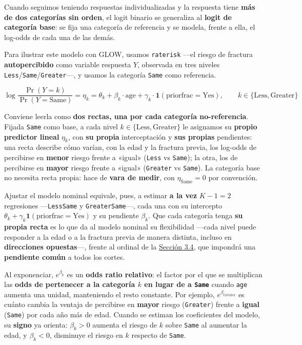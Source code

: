\documentclass[
  letterpaper,
  DIV=11,
  numbers=noendperiod]{scrartcl}
\begin{document}
Cuando seguimos teniendo respuestas individualizadas y la respuesta
tiene \textbf{más de dos categorías sin orden}, el logit binario se
generaliza al \textbf{logit de categoría base}: se fija una categoría de
referencia y se modela, frente a ella, el log-odds de cada una de las
demás.

Para ilustrar este modelo con GLOW, usamos \texttt{raterisk} ---el
riesgo de fractura \textbf{autopercibido} como variable respuesta \(Y\),
observada en tres niveles
\texttt{Less}/\texttt{Same}/\texttt{Greater}---, y usamos la categoría
\texttt{Same} como referencia.

\[
 \log\frac{\Pr(Y=k)}{\Pr(Y=\text{Same})}=\eta_{k}= \theta_{k} + \beta_{k} \cdot \text{age} + \gamma_{k} \cdot \mathbf{1}(\text{priorfrac}=\text{Yes}), \qquad k\in\{\text{Less},\text{Greater}\}
 \]

Conviene leerla como \textbf{dos rectas, una por cada categoría
no-referencia}. Fijada \texttt{Same} como base, a cada nivel
\(k\in\{\text{Less},\text{Greater}\}\) le asignamos su \textbf{propio
predictor lineal} \(\eta_{k}\), con \textbf{su propia} interceptación y
\textbf{sus propias} pendientes: una recta describe cómo varían, con la
edad y la fractura previa, los log-odds de percibirse en \textbf{menor}
riesgo frente a «igual» (\texttt{Less} vs \texttt{Same}); la otra, los
de percibirse en \textbf{mayor} riesgo frente a «igual»
(\texttt{Greater} vs \texttt{Same}). La categoría base no necesita recta
propia: hace de \textbf{vara de medir}, con \(\eta_{\text{Same}}=0\) por
convención.

Ajustar el modelo nominal equivale, pues, a estimar \textbf{a la vez}
\(K−1=2\) regresiones ---\texttt{Less\textbar{}Same} y
\texttt{Greater\textbar{}Same}---, cada una con su intercepto
\(\theta_k+\gamma_k\mathbf{1}(\text{priorfrac}=\text{Yes})\) y su
pendiente \(\beta_k\). Que cada categoría tenga \textbf{su propia recta}
es lo que da al modelo nominal su flexibilidad ---cada nivel puede
responder a la edad o a la fractura previa de manera distinta, incluso
en \textbf{direcciones opuestas}---, frente al ordinal de la
\protect\hyperlink{sec-u13-ordinal}{Sección 3.4}, que impondrá una
\textbf{pendiente común} a todos los cortes.

Al exponenciar, \(e^{\beta_k}\) es un \textbf{odds ratio relativo}: el
factor por el que se multiplican las \textbf{odds de pertenecer a la
categoría \(k\) en lugar de a \texttt{Same}} cuando \texttt{age} aumenta
una unidad, manteniendo el resto constante. Por ejemplo,
\(e^{\beta_{\text{Greater}}}\) es cuánto cambia la ventaja de percibirse
en \textbf{mayor} riesgo (\texttt{Greater}) frente a \textbf{igual}
(\texttt{Same}) por cada año más de edad. Cuando se estiman los
coeficientes del modelo, su \textbf{signo} ya orienta: \(\beta_{k}>0\)
aumenta el riesgo de \(k\) sobre \texttt{Same} al aumentar la edad, y
\(\beta_{k}<0\), disminuye el riesgo en \(k\) respecto de \texttt{Same}.
\end{document}
